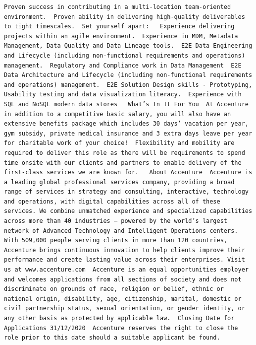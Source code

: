 \documentclass[
]{article}
\begin{document}
\begin{verbatim}
Proven success in contributing in a multi-location team-oriented environment.  Proven ability in delivering high-quality deliverables to tight timescales.  Set yourself apart:   Experience delivering projects within an agile environment.  Experience in MDM, Metadata Management, Data Quality and Data Lineage tools.  E2E Data Engineering and Lifecycle (including non-functional requirements and operations) management.  Regulatory and Compliance work in Data Management  E2E Data Architecture and Lifecycle (including non-functional requirements and operations) management.  E2E Solution Design skills - Prototyping, Usability testing and data visualization literacy.  Experience with SQL and NoSQL modern data stores   What’s In It For You  At Accenture in addition to a competitive basic salary, you will also have an extensive benefits package which includes 30 days’ vacation per year, gym subsidy, private medical insurance and 3 extra days leave per year for charitable work of your choice!  Flexibility and mobility are required to deliver this role as there will be requirements to spend time onsite with our clients and partners to enable delivery of the first-class services we are known for.   About Accenture  Accenture is a leading global professional services company, providing a broad range of services in strategy and consulting, interactive, technology and operations, with digital capabilities across all of these services. We combine unmatched experience and specialized capabilities across more than 40 industries — powered by the world’s largest network of Advanced Technology and Intelligent Operations centers. With 509,000 people serving clients in more than 120 countries, Accenture brings continuous innovation to help clients improve their performance and create lasting value across their enterprises. Visit us at www.accenture.com  Accenture is an equal opportunities employer and welcomes applications from all sections of society and does not discriminate on grounds of race, religion or belief, ethnic or national origin, disability, age, citizenship, marital, domestic or civil partnership status, sexual orientation, or gender identity, or any other basis as protected by applicable law.  Closing Date for Applications 31/12/2020  Accenture reserves the right to close the role prior to this date should a suitable applicant be found.

\end{verbatim}
\end{document}
